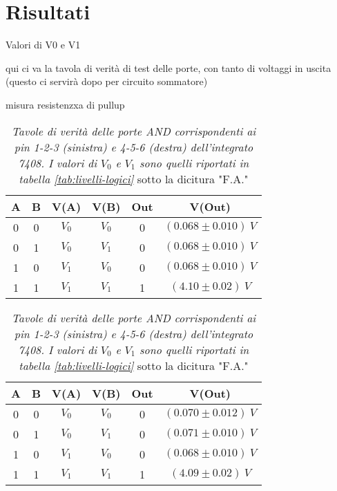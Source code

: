 \section{Risultati}\label{sec:risultati}
  Valori di V0 e V1 %

qui ci va la tavola di verità di test delle porte, con tanto di voltaggi in uscita (questo ci servirà dopo per circuito sommatore)

misura resistenzxa di pullup

\begin{table}[H]
  \centering
  \begin{subtable}[c]{0.5\textwidth}
    \centering
    \begin{tabular}[t]{c  c | c  c | c  c}
      \hline
      A & B & V(A) & V(B) & Out & V(Out) \\
      \hline
      0 & 0 & $V_{0}$ & $V_{0}$ & 0 & $(0.068 \pm 0.010) \: V$ \\
      0 & 1 & $V_{0}$ & $V_{1}$ & 0 & $(0.068 \pm 0.010) \: V$ \\
      1 & 0 & $V_{1}$ & $V_{0}$ & 0 & $(0.068 \pm 0.010) \: V$ \\
      1 & 1 & $V_{1}$ & $V_{1}$ & 1 & $(4.10 \pm 0.02) \: V$ \\
      \hline
    \end{tabular}
  \end{subtable}
  \begin{subtable}[c]{0.5\textwidth}
    \centering
    \begin{tabular}[t]{c  c | c  c | c  c}
      \hline
      A & B & V(A) & V(B) & Out & V(Out) \\
      \hline
      0 & 0 & $V_{0}$ & $V_{0}$ & 0 & $(0.070 \pm 0.012) \: V$ \\
      0 & 1 & $V_{0}$ & $V_{1}$ & 0 & $(0.071 \pm 0.010) \: V$ \\
      1 & 0 & $V_{1}$ & $V_{0}$ & 0 & $(0.068 \pm 0.010) \: V$ \\
      1 & 1 & $V_{1}$ & $V_{1}$ & 1 & $(4.09 \pm 0.02) \: V$ \\
      \hline
    \end{tabular}
  \end{subtable}
  \caption{\emph{Tavole di verità delle porte \emph{AND} corrispondenti ai pin 1-2-3 (sinistra) e 4-5-6 (destra) dell'integrato 7408. I valori di $V_{0}$ e $V_{1}$ sono quelli riportati in tabella \ref{tab:livelli-logici}} sotto la dicitura "F.A."}
  \label{tab:and-fulladder}
\end{table}

